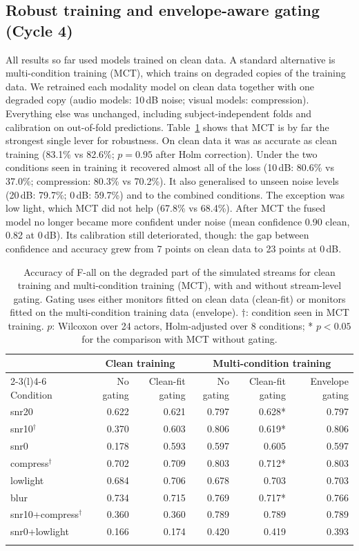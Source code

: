 \subsection{Robust training and envelope-aware gating (Cycle 4)}

All results so far used models trained on clean data. A standard alternative is multi-condition training (MCT), which trains on degraded copies of the training data. We retrained each modality model on clean data together with one degraded copy (audio models: 10\,dB noise; visual models: compression). Everything else was unchanged, including subject-independent folds and calibration on out-of-fold predictions. Table~\ref{tab:mct} shows that MCT is by far the strongest single lever for robustness. On clean data it was as accurate as clean training (83.1\% vs 82.6\%; $p=0.95$ after Holm correction). Under the two conditions seen in training it recovered almost all of the loss (10\,dB: 80.6\% vs 37.0\%; compression: 80.3\% vs 70.2\%). It also generalised to unseen noise levels (20\,dB: 79.7\%; 0\,dB: 59.7\%) and to the combined conditions. The exception was low light, which MCT did not help (67.8\% vs 68.4\%). After MCT the fused model no longer became more confident under noise (mean confidence 0.90 clean, 0.82 at 0\,dB). Its calibration still deteriorated, though: the gap between confidence and accuracy grew from 7 points on clean data to 23 points at 0\,dB.

\begin{table}[t]
\caption{Accuracy of F-all on the degraded part of the simulated streams for clean training and multi-condition training (MCT), with and without stream-level gating. Gating uses either monitors fitted on clean data (clean-fit) or monitors fitted on the multi-condition training data (envelope). $\dagger$: condition seen in MCT training. $p$: Wilcoxon over 24 actors, Holm-adjusted over 8 conditions; * $p<0.05$ for the comparison with MCT without gating.}\label{tab:mct}
\centering\footnotesize
\begin{tabular}{@{}lrrrrr@{}}
\toprule
 & \multicolumn{2}{c}{Clean training} & \multicolumn{3}{c}{Multi-condition training} \\
\cmidrule(lr){2-3}\cmidrule(l){4-6}
Condition & No gating & Clean-fit gating & No gating & Clean-fit gating & Envelope gating \\
\midrule
snr20 & 0.622 & 0.621 & 0.797 & 0.628* & 0.797 \\
snr10$^\dagger$ & 0.370 & 0.603 & 0.806 & 0.619* & 0.806 \\
snr0 & 0.178 & 0.593 & 0.597 & 0.605 & 0.597 \\
compress$^\dagger$ & 0.702 & 0.709 & 0.803 & 0.712* & 0.803 \\
lowlight & 0.684 & 0.706 & 0.678 & 0.703 & 0.703 \\
blur & 0.734 & 0.715 & 0.769 & 0.717* & 0.766 \\
snr10+compress$^\dagger$ & 0.360 & 0.360 & 0.789 & 0.789 & 0.789 \\
snr0+lowlight & 0.166 & 0.174 & 0.420 & 0.419 & 0.393 \\
\botrule
\end{tabular}
\end{table}

